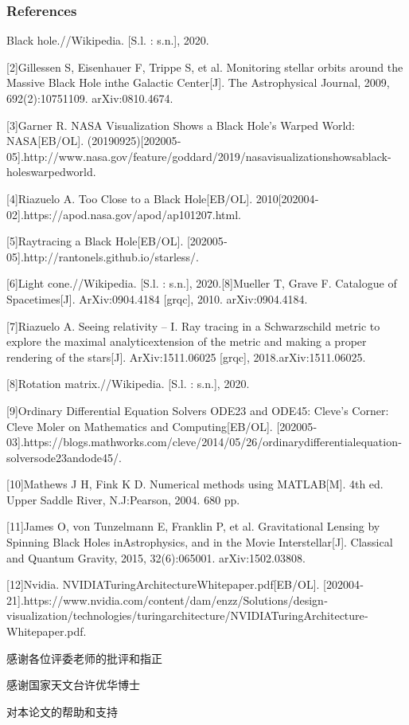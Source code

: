 \documentclass{beamer}
\begin{document}
\begin{frame}
    \frametitle{References}
    \setlength{\parskip}{0.5em}
    \fontsize{6pt}{7.2}\selectfont
    [1]Black hole.//Wikipedia. [S.l. : s.n.], 2020.

    [2]Gillessen S, Eisenhauer F, Trippe S, et al. Monitoring stellar orbits around the Massive Black Hole inthe Galactic Center[J]. The Astrophysical Journal, 2009, 692(2):1075­1109. arXiv:0810.4674.

    [3]Garner R. NASA Visualization Shows a Black Hole’s Warped World: NASA[EB/OL]. (2019­09­25)[2020­05­05].http://www.nasa.gov/feature/goddard/2019/nasa­visualization­shows­a­black­hole­s­warped­world.

    [4]Riazuelo A. Too Close to a Black Hole[EB/OL]. 2010[2020­04­02].https://apod.nasa.gov/apod/ap101207.html.

    [5]Raytracing a Black Hole[EB/OL]. [2020­05­05].http://rantonels.github.io/starless/.

    [6]Light cone.//Wikipedia. [S.l. : s.n.], 2020.[8]Mueller T, Grave F. Catalogue of Spacetimes[J]. ArXiv:0904.4184 [gr­qc], 2010. arXiv:0904.4184.

    [7]Riazuelo A. Seeing relativity – I. Ray tracing in a Schwarzschild metric to explore the maximal analyticextension of the metric and making a proper rendering of the stars[J]. ArXiv:1511.06025 [gr­qc], 2018.arXiv:1511.06025.

    [8]Rotation matrix.//Wikipedia. [S.l. : s.n.], 2020.

    [9]Ordinary Differential Equation Solvers ODE23 and ODE45: Cleve’s Corner: Cleve Moler on Math­ematics and Computing[EB/OL]. [2020­05­03].https://blogs.mathworks.com/cleve/2014/05/26/ordinary­differential­equation­solvers­ode23­and­ode45/.

    [10]Mathews J H, Fink K D. Numerical methods using MATLAB[M]. 4th ed. Upper Saddle River, N.J:Pearson, 2004. 680 pp.

    [11]James O, von Tunzelmann E, Franklin P, et al. Gravitational Lensing by Spinning Black Holes inAstrophysics, and in the Movie Interstellar[J]. Classical and Quantum Gravity, 2015, 32(6):065001. arXiv:1502.03808.

    [12]Nvidia. NVIDIA­Turing­Architecture­Whitepaper.pdf[EB/OL]. [2020­04­21].https://www.nvidia.com/content/dam/en­zz/Solutions/design­visualization/technologies/turing­architecture/NVIDIA­Turing­Architecture­Whitepaper.pdf.

\end{frame}



\begin{frame}
    \huge{\centerline{感谢各位评委老师的批评和指正}}
    \vspace{8mm}
    \Large{\centerline{感谢国家天文台许优华博士}}
    \Large{\centerline{对本论文的帮助和支持}}
\end{frame}

\end{document}
